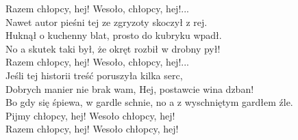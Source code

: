 Razem chłopcy, hej! Wesoło, chłopcy, hej!... \\

Nawet autor pieśni tej ze zgryzoty skoczył z rej. \\
Huknął o kuchenny blat, prosto do kubryku wpadł. \\
No a skutek taki był, że okręt rozbił w drobny pył! \\

Razem chłopcy, hej! Wesoło, chłopcy, hej!... \\

Jeśli tej historii treść poruszyła kilka serc, \\
Dobrych manier nie brak wam, Hej, postawcie wina dzban! \\
Bo gdy się śpiewa, w gardle schnie, no a z wyschniętym gardłem źle. \\

Pijmy chłopcy, hej! Wesoło chłopcy, hej! \\
Razem chłopcy, hej! Wesoło chłopcy, hej! 